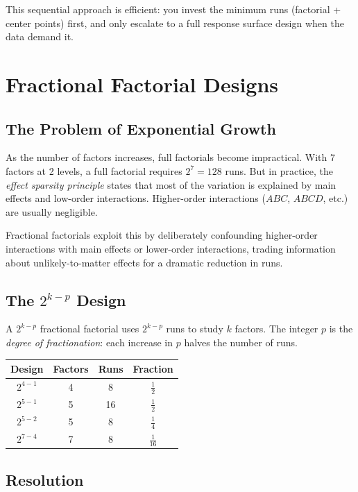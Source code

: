 \documentclass[11pt]{book}
\begin{document}
This sequential approach is efficient: you invest the minimum runs (factorial +
center points) first, and only escalate to a full response surface design when
the data demand it.

\chapter{Fractional Factorial Designs}

\section{The Problem of Exponential Growth}

As the number of factors increases, full factorials become impractical. With 7
factors at 2 levels, a full factorial requires $2^7 = 128$ runs. But in
practice, the \emph{effect sparsity principle} states that most of the variation
is explained by main effects and low-order interactions. Higher-order
interactions ($ABC$, $ABCD$, etc.) are usually negligible.

Fractional factorials exploit this by deliberately confounding higher-order
interactions with main effects or lower-order interactions, trading information
about unlikely-to-matter effects for a dramatic reduction in runs.

\section{The $2^{k-p}$ Design}

A $2^{k-p}$ fractional factorial uses $2^{k-p}$ runs to study $k$ factors. The
integer $p$ is the \emph{degree of fractionation}: each increase in $p$ halves
the number of runs.

\begin{center}
\begin{tabular}{cccc}
\toprule
Design & Factors & Runs & Fraction \\
\midrule
$2^{4-1}$ & 4 & 8 & $\frac{1}{2}$ \\
$2^{5-1}$ & 5 & 16 & $\frac{1}{2}$ \\
$2^{5-2}$ & 5 & 8 & $\frac{1}{4}$ \\
$2^{7-4}$ & 7 & 8 & $\frac{1}{16}$ \\
\bottomrule
\end{tabular}
\end{center}

\section{Resolution}
\end{document}
